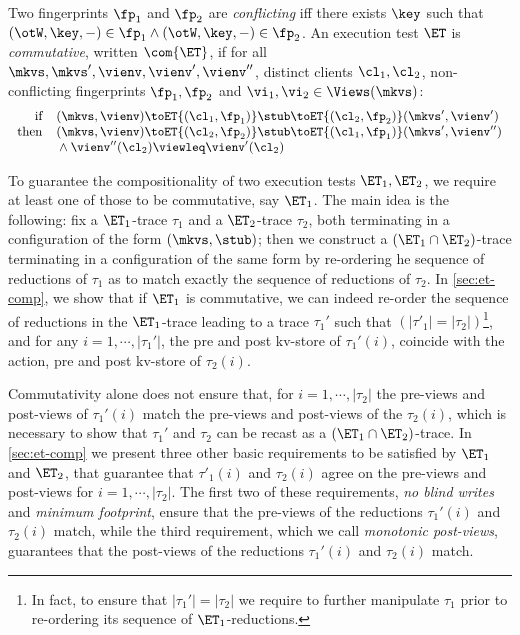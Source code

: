 


\begin{definition}
\label{def:et-comm}
Two fingerprints $\fp_1$ and $\fp_2$ are \emph{conflicting} 
iff there exists $\key$ such that 
$(\otW, \key, -) \in \fp_1 \land (\otW, \key, -) \in \fp_2$. 
An execution test $\ET$ is \emph{commutative}, written $\com{\ET}$, if 
for all \( \mkvs, \mkvs', \vienv, \vienv',\vienv''\), distinct clients \( \cl_1, \cl_2 \), non-conflicting fingerprints \( \fp_1, \fp_2  \) and \( \vi_1, \vi_2 \in \Views(\mkvs) \):%
%
{%
\[
\small
\begin{array}{@{}r @{\hspace{10pt}} l @{}}
	\text{if} &  
	(\mkvs, \vienv) \toET{(\cl_1, \fp_1)} 
	\stub \toET{(\cl_2, \fp_2)} (\mkvs', \vienv') \\
	\text{then} & (\mkvs, \vienv) \toET{(\cl_2, \fp_2)}
    \stub \toET{(\cl_1, \fp_1)} (\mkvs', \vienv'') \\
    & {} \land \vienv''(\cl_2) \viewleq \vienv'(\cl_2)
\end{array}
\]%
}%
\end{definition}

To guarantee the compositionality of two execution tests $\ET_1, \ET_2$, we 
require at least one of those to be commutative, say $\ET_1$. The main idea 
is the following: fix a $\ET_1$-trace $\tau_1$ and a $\ET_2$-trace $\tau_2$, both terminating in a configuration 
of the form $(\mkvs, \stub)$; then we construct a $(\ET_1 \cap \ET_2)$-trace terminating 
in a configuration of the same form by re-ordering he sequence of 
reductions of $\tau_1$ as to match exactly the sequence of 
reductions of $\tau_2$. 
In \cref{sec:et-comp}, we show that if $\ET_1$ is commutative, 
we can indeed re-order the sequence of reductions in the 
$\ET_1$-trace leading to a trace $\tau_1'$ such that $(\lvert \tau'_1 \rvert = \lvert \tau_2 \rvert)$\footnote{In fact, 
to ensure that $\lvert \tau_1' \rvert = \lvert \tau_2 \rvert$ we require to further manipulate 
$\tau_1$ prior to re-ordering its sequence of $\ET_1$-reductions.}, 
and for any 
$i=1,\cdots, \lvert \tau_1'\rvert$, the pre and post kv-store of $\tau_1'(i)$,
 coincide with the action, pre and post kv-store 
of $\tau_2(i)$.


Commutativity alone does not ensure that, for $i=1,\cdots,\lvert \tau_2 \rvert$ the 
pre-views and post-views of $\tau_1'(i)$ 
match the pre-views and post-views of the $\tau_2(i)$, which is necessary to show 
that $\tau_1'$ and $\tau_2$ can be recast as a $(\ET_1 \cap \ET_2)$-trace. 
In \cref{sec:et-comp} we present three other basic requirements to be 
satisfied by $\ET_1$ and $\ET_2$, that guarantee that $\tau'_1(i)$ and 
$\tau_2(i)$ agree on the pre-views and post-views for $i=1,\cdots, \lvert \tau_2 \rvert$. 
The first two of these requirements,  \emph{no blind writes} and \emph{minimum footprint}, 
ensure that the pre-views of the reductions $\tau_1'(i)$ and $\tau_2(i)$ match, 
while the third requirement, which we call \emph{monotonic post-views}, 
guarantees that the post-views of the reductions $\tau_1'(i)$ and $\tau_2(i)$ 
match. 
 
